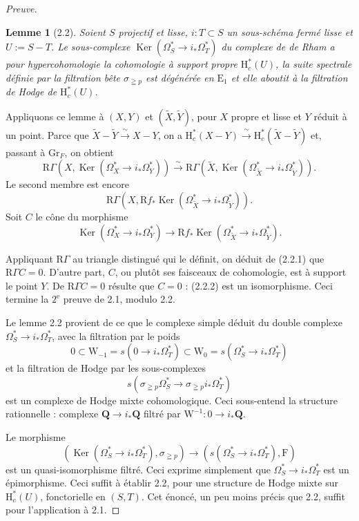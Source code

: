 \documentclass[12pt,a4paper]{article}
\theoremstyle{plain}
\newtheorem{lemma}[theorem]{Lemme}
\theoremstyle{definition}
\DeclareMathOperator{\Ker}{Ker}
\begin{document}
\begin{proof}[Preuve]
\begin{lemma}[2.2]
Soient $S$ projectif et lisse, $i : T \subset S$ un sous-schéma fermé lisse et $U := S - T$. Le sous-complexe $\Ker(\Omega_S^* \to i_* \Omega_T^*)$ du complexe de de Rham a pour hypercohomologie la cohomologie à support propre $\mathrm{H}_c^*(U)$, la suite spectrale définie par la filtration bête $\sigma_{\geqq p}$ est dégénérée en $\mathrm{E}_1$ et elle aboutit à la filtration de Hodge de $\mathrm{H}_c^*(U)$.
\end{lemma}

Appliquons ce lemme à $(X, Y)$ et $(\tilde{X}, \tilde{Y})$, pour $X$ propre et lisse et $Y$ réduit à un point. Parce que $\tilde{X} - \tilde{Y} \xrightarrow{\;\sim\;} X - Y$, on a $\mathrm{H}_c^*(X-Y) \xrightarrow{\;\sim\;} \mathrm{H}_c^*(\tilde{X} - \tilde{Y})$ et, passant à $\mathrm{Gr}_F$, on obtient
\begin{equation}\label{eq:2.2.1}
\mathrm{R}\Gamma(X, \Ker(\Omega_X^* \to i_* \Omega_Y^*)) \xrightarrow{\;\sim\;} \mathrm{R}\Gamma(\tilde{X}, \Ker(\Omega_{\tilde{X}}^* \to i_* \Omega_{\tilde{Y}}^*)).
\tag{2.2.1}
\end{equation}
Le second membre est encore
\[
\mathrm{R}\Gamma(X, \mathrm{R}f_* \Ker(\Omega_{\tilde{X}}^* \to i_* \Omega_{\tilde{Y}}^*)).
\]
Soit $C$ le cône du morphisme
\begin{equation}\label{eq:2.2.2}
\Ker(\Omega_X^* \to i_* \Omega_Y^*) \to \mathrm{R}f_* \Ker(\Omega_{\tilde{X}}^* \to i_* \Omega_{\tilde{Y}}^*).
\tag{2.2.2}
\end{equation}

Appliquant $\mathrm{R}\Gamma$ au triangle distingué qui le définit, on déduit de (2.2.1) que $\mathrm{R}\Gamma C = 0$. D'autre part, $C$, ou plutôt ses faisceaux de cohomologie, est à support le point $Y$. De $\mathrm{R}\Gamma C = 0$ résulte que $C = 0$ : (2.2.2) est un isomorphisme. Ceci termine la $2^{\text{e}}$ preuve de 2.1, modulo 2.2.

Le lemme 2.2 provient de ce que le complexe simple déduit du double complexe $\Omega_S^* \to i_* \Omega_T^*$, avec la filtration par le poids
\[
0 \subset \mathrm{W}_{-1} = s(0 \to i_* \Omega_T^*) \subset \mathrm{W}_0 = s(\Omega_S^* \to i_* \Omega_T^*)
\]
et la filtration de Hodge par les sous-complexes
\[
s(\sigma_{\geqq p} \Omega_S^* \to \sigma_{\geqq p} i_* \Omega_T^*)
\]
est un complexe de Hodge mixte cohomologique. Ceci sous-entend la structure rationnelle : complexe $\mathbf{Q} \to i_* \mathbf{Q}$ filtré par $\mathrm{W}^{-1} : 0 \to i_* \mathbf{Q}$.

Le morphisme
\[
(\Ker(\Omega_S^* \to i_* \Omega_T^*), \sigma_{\geqq p}) \to (s(\Omega_S^* \to i_* \Omega_T^*), \mathrm{F})
\]
est un quasi-isomorphisme filtré. Ceci exprime simplement que $\Omega_S^* \to i_* \Omega_T^*$ est un épimorphisme. Ceci suffit à établir 2.2, pour une structure de Hodge mixte sur $\mathrm{H}_c^*(U)$, fonctorielle en $(S, T)$. Cet énoncé, un peu moins précis que 2.2, suffit pour l'application à 2.1.
\end{proof}
\end{document}
